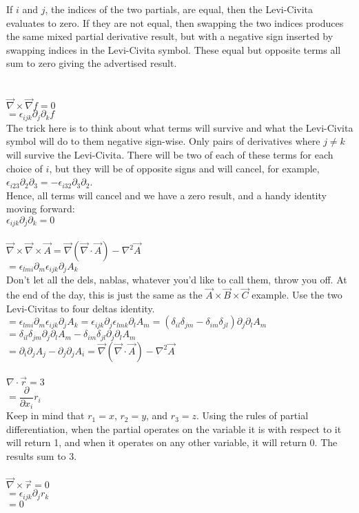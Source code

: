 \documentclass[prb,preprint]
{revtex4-1}
\newcommand{\PRLsep}{\noindent\makebox[\linewidth]{\resizebox{0.8888\linewidth}{2pt}{$\bullet$}}\bigskip}
\begin{document}
If $i$ and $j$, the indices of the two partials, are equal, then the Levi-Civita evaluates to zero.  If they are not equal, then swapping the two indices produces the same mixed partial derivative result, but with a negative sign inserted by swapping indices in the Levi-Civita symbol.  These equal but opposite terms all sum to zero giving the advertised result.
\\\\
\PRLsep
\\
$\vec{\nabla} \times \vec{\nabla}f = 0$
\\
$= \epsilon_{ijk} \partial_j \partial_k f$
\\
The trick here is to think about what terms will survive and what the Levi-Civita symbol will do to them negative sign-wise.  Only pairs of derivatives where $j \ne k$ will survive the Levi-Civita.  There will be two of each of these terms for each choice of $i$, but they will be of opposite signs and will cancel, for example,
\\
$\epsilon_{i23}\partial_2 \partial_3 = -\epsilon_{i32}\partial_3 \partial_2$.
\\
Hence, all terms will cancel and we have a zero result, and a handy identity moving forward:
\\
$\epsilon_{ijk}\partial_j\partial_k = 0$
\\
\PRLsep
\\
$\vec{\nabla} \times \vec{\nabla} \times \vec{A} = \vec{\nabla}\left(\vec{\nabla} \cdot \vec{A}\right) - \nabla^2 \vec{A}$
\\
$= \epsilon_{lmi} \partial_m \epsilon_{ijk} \partial_j A_k$
\\
Don't let all the dels, nablas, whatever you'd like to call them, throw you off.  At the end of the day, this is just the same as the $\vec{A} \times \vec{B} \times \vec{C}$ example.  Use the two Levi-Civitas to four deltas identity.\\
$= \epsilon_{lmi} \partial_m \epsilon_{ijk} \partial_j A_k = \epsilon_{ijk} \partial_j \epsilon_{lmk} \partial_l A_m  = \left(\delta_{il}\delta_{jm} - \delta_{im}\delta_{jl}\right)\partial_j\partial_l A_m$
\\
$=\delta_{il}\delta_{jm}\partial_j\partial_l A_m - \delta_{im}\delta_{jl}\partial_j\partial_l A_m$
\\
$= \partial_i \partial_j A_j - \partial_j \partial_j A_i = \vec{\nabla}\left(\vec{\nabla}\cdot \vec{A}\right) - \nabla^2 \vec{A}$
\\
\PRLsep
\\
$\nabla \cdot \vec{r} = 3$\\
$= \dfrac{\partial}{\partial x_i} r_i$\\
Keep in mind that $r_1 = x$, $r_2 = y$, and $r_3 = z$.  Using the rules of partial differentiation, when the partial operates on the variable it is with respect to it will return 1, and when it operates on any other variable, it will return 0.  The results sum to 3.
\\
\PRLsep
\\
$\vec{\nabla} \times \vec{r} = 0$\\
$=\epsilon_{ijk} \partial_j r_k$\\
$= 0$
\end{document}
